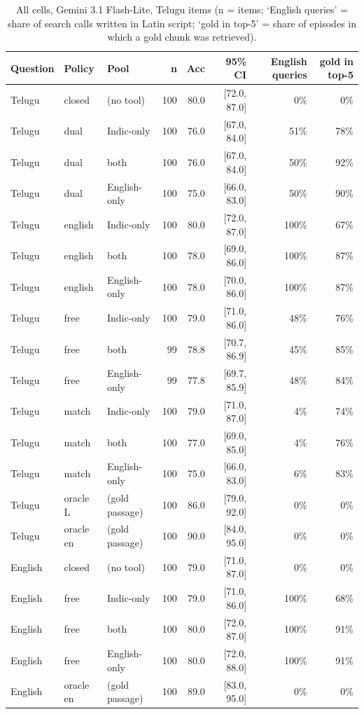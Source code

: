 \begin{table}[htbp]\centering\scriptsize
\begin{tabular}{lllrrrrr}
\toprule
Question & Policy & Pool & n & Acc & 95\% CI & English queries & gold in top-5 \\
\midrule
Telugu & closed & (no tool) & 100 & 80.0 & [72.0, 87.0] & 0\% & 0\% \\
Telugu & dual & Indic-only & 100 & 76.0 & [67.0, 84.0] & 51\% & 78\% \\
Telugu & dual & both & 100 & 76.0 & [67.0, 84.0] & 50\% & 92\% \\
Telugu & dual & English-only & 100 & 75.0 & [66.0, 83.0] & 50\% & 90\% \\
Telugu & english & Indic-only & 100 & 80.0 & [72.0, 87.0] & 100\% & 67\% \\
Telugu & english & both & 100 & 78.0 & [69.0, 86.0] & 100\% & 87\% \\
Telugu & english & English-only & 100 & 78.0 & [70.0, 86.0] & 100\% & 87\% \\
Telugu & free & Indic-only & 100 & 79.0 & [71.0, 86.0] & 48\% & 76\% \\
Telugu & free & both & 99 & 78.8 & [70.7, 86.9] & 45\% & 85\% \\
Telugu & free & English-only & 99 & 77.8 & [69.7, 85.9] & 48\% & 84\% \\
Telugu & match & Indic-only & 100 & 79.0 & [71.0, 87.0] & 4\% & 74\% \\
Telugu & match & both & 100 & 77.0 & [69.0, 85.0] & 4\% & 76\% \\
Telugu & match & English-only & 100 & 75.0 & [66.0, 83.0] & 6\% & 83\% \\
Telugu & oracle L & (gold passage) & 100 & 86.0 & [79.0, 92.0] & 0\% & 0\% \\
Telugu & oracle en & (gold passage) & 100 & 90.0 & [84.0, 95.0] & 0\% & 0\% \\
English & closed & (no tool) & 100 & 79.0 & [71.0, 87.0] & 0\% & 0\% \\
English & free & Indic-only & 100 & 79.0 & [71.0, 86.0] & 100\% & 68\% \\
English & free & both & 100 & 80.0 & [72.0, 87.0] & 100\% & 91\% \\
English & free & English-only & 100 & 80.0 & [72.0, 88.0] & 100\% & 91\% \\
English & oracle en & (gold passage) & 100 & 89.0 & [83.0, 95.0] & 0\% & 0\% \\
\bottomrule
\end{tabular}
\caption{All cells, Gemini 3.1 Flash-Lite, Telugu items (n = items; `English queries' = share of search calls written in Latin script; `gold in top-5' = share of episodes in which a gold chunk was retrieved).}
\end{table}

